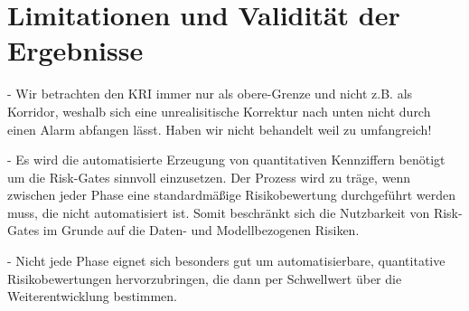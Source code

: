 \section{Limitationen und Validität der Ergebnisse}

- Wir betrachten den KRI immer nur als obere-Grenze und nicht z.B. als Korridor, weshalb sich eine 
unrealisitische Korrektur nach unten nicht durch einen Alarm abfangen lässt. Haben wir nicht behandelt weil zu umfangreich!

- Es wird die automatisierte Erzeugung von quantitativen Kennziffern benötigt um die Risk-Gates sinnvoll einzusetzen. Der Prozess wird 
    zu träge, wenn zwischen jeder Phase eine standardmäßige Risikobewertung durchgeführt werden muss, die nicht automatisiert ist. Somit 
    beschränkt sich die Nutzbarkeit von Risk-Gates im Grunde auf die Daten- und Modellbezogenen Risiken.

- Nicht jede Phase eignet sich besonders gut um automatisierbare, quantitative Risikobewertungen hervorzubringen, die dann 
per Schwellwert über die Weiterentwicklung bestimmen.